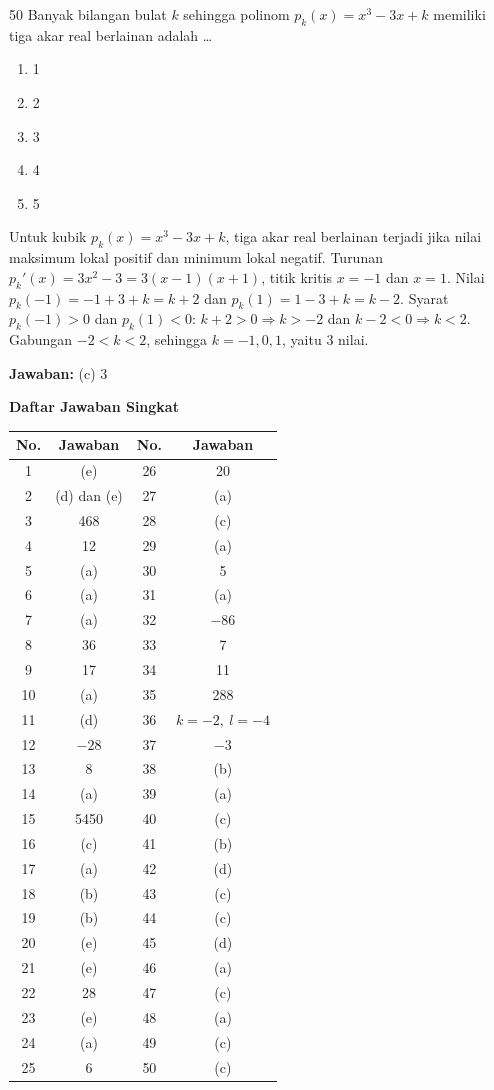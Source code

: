 \documentclass[11pt]{article}
\newenvironment{pil}{\begin{enumerate}[label=(\alph*),leftmargin=*,itemsep=1pt,topsep=3pt]}{\end{enumerate}}
\newcommand{\jw}[1]{\par\smallskip\noindent\textbf{Jawaban:} #1}
\begin{document}
\begin{soalbox}{50}
Banyak bilangan bulat $k$ sehingga polinom $p_k(x)=x^3-3x+k$ memiliki tiga akar real berlainan adalah \ldots
\begin{pil}\item 1 \item 2 \item 3 \item 4 \item 5\end{pil}
\end{soalbox}
\begin{pembox}
Untuk kubik $p_k(x)=x^3-3x+k$, tiga akar real berlainan terjadi jika nilai maksimum lokal positif dan minimum lokal negatif. Turunan $p_k'(x)=3x^2-3=3(x-1)(x+1)$, titik kritis $x=-1$ dan $x=1$. Nilai $p_k(-1)=-1+3+k=k+2$ dan $p_k(1)=1-3+k=k-2$. Syarat $p_k(-1)>0$ dan $p_k(1)<0$: $k+2>0\Rightarrow k>-2$ dan $k-2<0\Rightarrow k<2$. Gabungan $-2<k<2$, sehingga $k=-1,0,1$, yaitu 3 nilai.
\jw{(c) 3}
\end{pembox}

\begin{center}\textbf{\large Daftar Jawaban Singkat}\end{center}
\begin{center}\small
\begin{tabular}{cc@{\qquad}cc}
\hline
No. & Jawaban & No. & Jawaban\\
\hline
1 & (e) & 26 & 20\\
2 & (d) dan (e) & 27 & (a)\\
3 & 468 & 28 & (c)\\
4 & 12 & 29 & (a)\\
5 & (a) & 30 & 5\\
6 & (a) & 31 & (a)\\
7 & (a) & 32 & $-86$\\
8 & 36 & 33 & 7\\
9 & 17 & 34 & 11\\
10 & (a) & 35 & 288\\
11 & (d) & 36 & $k=-2,\ l=-4$\\
12 & $-28$ & 37 & $-3$\\
13 & 8 & 38 & (b)\\
14 & (a) & 39 & (a)\\
15 & 5450 & 40 & (c)\\
16 & (c) & 41 & (b)\\
17 & (a) & 42 & (d)\\
18 & (b) & 43 & (c)\\
19 & (b) & 44 & (c)\\
20 & (e) & 45 & (d)\\
21 & (e) & 46 & (a)\\
22 & 28 & 47 & (c)\\
23 & (e) & 48 & (a)\\
24 & (a) & 49 & (c)\\
25 & 6 & 50 & (c)\\
\hline
\end{tabular}
\end{center}
\end{document}
